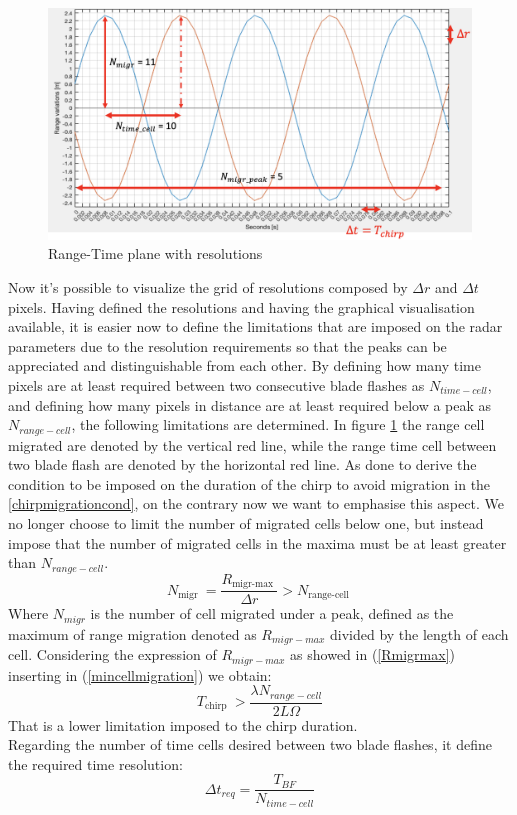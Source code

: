 \begin{figure}[h!]
\centering
\includegraphics[width=12cm]{FMCW mD analysis-chap4/img/resolution in ro.t.png}
\caption{Range-Time plane with resolutions}
\label{ideal_r_t_res}
\end{figure}

Now it's possible to visualize the grid of resolutions composed by $\Delta r$ and $\Delta t$ pixels. 
Having defined the resolutions and having the graphical visualisation available, it is easier now to define the limitations that are imposed on the radar parameters due to the resolution requirements so that the peaks can be appreciated and distinguishable from each other. By defining how many time pixels are at least required between two consecutive blade flashes as $N_{time-cell}$, and defining how many pixels in distance are at least required below a peak as $N_{range-cell}$, the following limitations are determined. In figure \ref{ideal_r_t_res} the range cell migrated are denoted by the vertical red line, while the range time cell between two blade flash are denoted by the horizontal red line. As done to derive the condition to be imposed on the duration of the chirp to avoid migration in the \ref{chirpmigrationcond}, on the contrary now we want to emphasise this aspect. We no longer choose to limit the number of migrated cells below one, but instead impose that the number of migrated cells in the maxima must be at least greater than $N_{range-cell}$.
\begin{equation}
N_{\text {migr }}=\frac{R_{\text {migr-max }}}{\Delta r}>N_{\text {range-cell }}
\label{mincellmigration}
\end{equation}
Where $N_{migr}$ is the number of cell migrated under a peak, defined as the maximum of range migration denoted as $R_{migr-max}$ divided by the length of each cell. Considering the expression of $R_{migr-max}$ as showed in (\ref{Rmigrmax}) inserting in (\ref{mincellmigration}) we obtain:
\begin{equation}
T_{\text {chirp }}>\frac{\lambda N_{range-cell }}{2 L \Omega}
\label{min_chirp_by_res_rt}
\end{equation}
That is a lower limitation imposed to the chirp duration.\\
Regarding the number of time cells desired between two blade flashes, it define the required time resolution:
\begin{equation}
\Delta t_{req} = \frac{T_{BF}}{N_{time-cell}}
\label{time_res_req_rt}
\end{equation}

